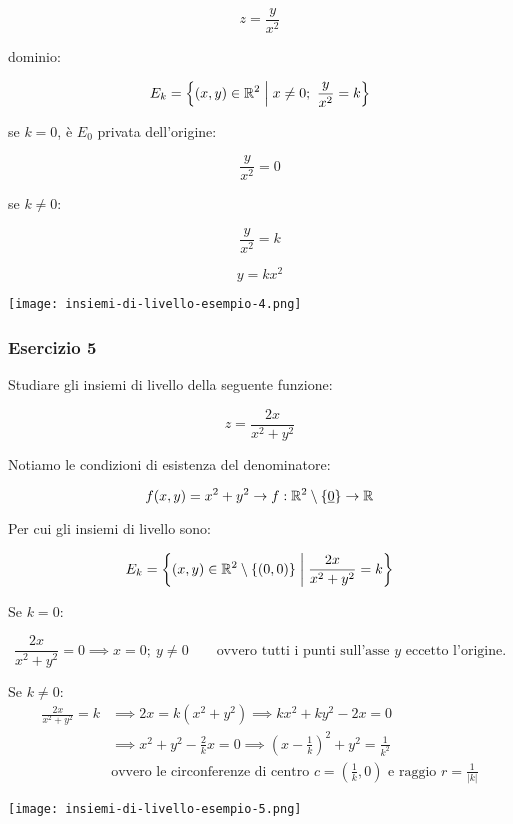 \[
    z= \frac{y}{x^{2}}
\]

dominio:

\[
    E_k = \left\{(x,y) \in \R^{2} \giventhat[\Big] x \neq  0;\ \frac{y}{x^{2}}=k \right\}
\]

se \(k=0\), è \(E_0\) privata dell'origine:

\[
    \frac{y}{x^{2}}=0
\]

se \(k \ne 0\):

\[
    \frac{y}{x^{2}} = k
\]

\[
    y = kx^{2}
\]

\vspace{5mm}
\begin{center}
    \texttt{[image: insiemi-di-livello-esempio-4.png]}
\end{center}

\filbreak{}
\subsubsection*{Esercizio 5}

Studiare gli insiemi di livello della seguente funzione:

\[
    z = \frac{2x}{x^2+y^2}
\]

Notiamo le condizioni di esistenza del denominatore:

\[f(x,y) = x^2 + y^2 \to f: \R^2 \setminus \{\uzero \} \to \R \]

Per cui gli insiemi di livello sono:

\[E_k = \left\{ (x,y) \in \R^2 \setminus \{(0,0)\} \giventhat[\bigg] \frac{2x}{x^2+y^2} = k \right\} \]

Se \(k=0\):

\[
    \frac{2x}{x^2+y^2} = 0 \implies x = 0;\ y \ne 0 \qquad \text{ovvero tutti i punti sull'asse \(y\) eccetto l'origine.}
\]

Se \(k \ne 0\):
\begin{align*}
    \frac{2x}{x^2+y^2} = k & \implies 2x = k (x^2+y^2) \implies kx^2 + ky^2 -2x = 0                                                        \\
                           & \implies x^2 + y^2 -\frac{2}{k}x = 0 \implies {\left( x-\frac{1}{k} \right)}^2 + y^2 = \frac{1}{k^2}          \\
                           & \text{ovvero le circonferenze di centro } c=\left( \frac{1}{k}, 0 \right) \text{ e raggio } r = \frac{1}{|k|}
\end{align*}
\begin{center}
    \texttt{[image: insiemi-di-livello-esempio-5.png]}
\end{center}

